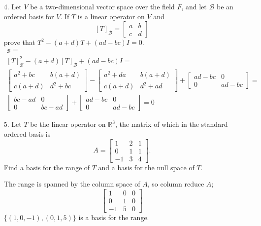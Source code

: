 \documentclass{article}
\begin{document}
\begin{enumerate}[listparindent=\parindent]
\item[4.] Let \(V\) be a two-dimensional vector space over the field \(F\), and let \(\mathcal{B}\) be an ordered basis for \(V\).
    If \(T\) is a linear operator on \(V\) and
    \[ [T]_\mathcal{B} = \begin{bmatrix} a & b \\ c & d \end{bmatrix} \]
    prove that \(T^2 - (a + d)T + (ad - bc)I = 0\).
    \begin{gather*}
        [T^2 - (a + d)T + (ad - bc)I = 0]_\mathcal{B} = \\
        [T]_\mathcal{B}^2 - (a + d)[T]_\mathcal{B} + (ad - bc)I = \\
        \begin{bmatrix} a^2 + bc & b(a + d) \\ c(a + d) & d^2 + bc \end{bmatrix} -
        \begin{bmatrix} a^2 + da & b(a + d) \\ c(a + d) & d^2 + ad \end{bmatrix} +
        \begin{bmatrix} ad - bc & 0 \\ 0 & ad - bc \end{bmatrix} = \\
        \begin{bmatrix} bc - ad & 0 \\ 0 & bc - ad \end{bmatrix} +
        \begin{bmatrix} ad - bc & 0 \\ 0 & ad - bc \end{bmatrix} = 0
    \end{gather*}

\item[5.] Let \(T\) be the linear operator on \(\mathbb{R}^3\), the matrix of which in the standard ordered basis is
    \[ A = \begin{bmatrix} 1 & 2 & 1 \\ 0 & 1 & 1 \\ -1 & 3 & 4 \end{bmatrix}. \]
    Find a basis for the range of \(T\) and a basis for the null space of \(T\).

The range is spanned by the column space of \(A\), so column reduce \(A\);
\[ \begin{bmatrix} 1 & 0 & 0 \\ 0 & 1 & 0 \\ -1 & 5 & 0 \end{bmatrix} \]
\(\{(1, 0, -1), (0, 1, 5)\}\) is a basis for the range.


\end{enumerate}
\end{document}
